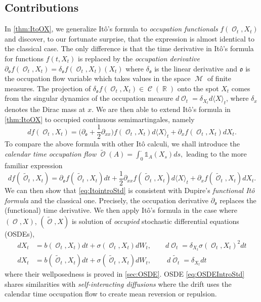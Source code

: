 \documentclass[11pt]{article}
\def\mo{\mathfrak{o}}
\theoremstyle{plain}
\theoremstyle{definition}
\DeclareMathOperator{\R}{\mathbb{R}}
\DeclareMathOperator{\calC}{\mathcal{C}}
\DeclareMathOperator{\calM}{\mathcal{M}}
\DeclareMathOperator{\calO}{\mathcal{O}}
\begin{document}
\subsection{Contributions}
In \cref{thm:ItoOX},  we generalize Itô's formula to \textit{occupation functionals} $ f(\calO_t,X_t)$  and discover, to our fortunate  
surprise, that the expression is almost identical to  the classical case. The only difference is that the time derivative  in Itô's formula for functions $ f(t,X_t)$ 
is replaced by the \textit{occupation derivative} $\partial_{\mo}f(\calO_t,X_t) = \delta_{\mo}f(\calO_t,X_t)(X_t)$ where $\delta_{\mo}$ 
is the linear derivative \cite[Chapter 2]{CardDelLasLio} and  $\mo$ is the occupation flow variable which takes values in the space $\calM$ of finite measures. The projection of  $\delta_{\mo}f(\calO_t,X_t) \in \calC(\R)$ onto the spot  $X_t$ comes from  the singular dynamics of  the occupation measure   
$d\calO_t = \delta_{X_t} d\langle X \rangle_t$, where $\delta_x$ denotes the Dirac mass at $x$.  
 We are  then able to extend Itô's formula in \cref{thm:ItoOX} to occupied continuous semimartingales, namely
\begin{equation}\label{eq:Itointro}
    df(\calO_t,X_t) = \Big(\partial_{\mo} + \frac{1}{2} \partial_{xx}\Big)f(\calO_t,X_t) d\langle X \rangle_t + \partial_x f(\calO_t,X_t)dX_t.
\end{equation}
 To compare the above formula with other It\^o calculi, we shall introduce the \textit{calendar time occupation flow} 
$\tilde{\calO}(A) = \int_0^{\cdot} \mathds{1}_{A}(X_s)ds,$ leading to the more familiar expression
\begin{equation}\label{eq:ItointroStd}
    df(\tilde{\calO}_t,X_t) = \partial_{\mo}f(\tilde{\calO}_t,X_t) dt +  \frac{1}{2} \partial_{xx}f(\tilde{\calO}_t,X_t) d\langle X \rangle_t + \partial_x f(\tilde{\calO}_t,X_t)dX_t.
\end{equation} 
We can then show that  \eqref{eq:ItointroStd} is consistent with  Dupire's \textit{functional Itô formula} \cite{DupireFITO} and the classical one. Precisely, the occupation derivative $\partial_{\mo}$ replaces   the (functional) time derivative. We then apply It\^o's formula in the case where $(\calO,X)$, $(\tilde{\calO},X)$ is solution of  \textit{occupied} stochastic differential equations (OSDEs),
\begin{align}
     dX_t  &=   b(\calO_t,X_t)dt + \sigma(\calO_t,X_t)dW_t, \qquad d\calO_t =  \delta_{X_t} \sigma(\calO_t,X_t)^2dt\label{eq:OSDEIntro} \\[0.5em] 
  dX_t  &=   b(\tilde{\calO}_t,X_t)dt + \sigma(\tilde{\calO}_t,X_t)dW_t, \qquad \ d\tilde{\calO}_t =  \delta_{X_t} dt\label{eq:OSDEIntroStd} 
\end{align}
where their wellposedness is proved in \cref{sec:OSDE}. OSDE \eqref{eq:OSDEIntroStd} shares similarities with \textit{self-interacting diffusions} \cite{DurrettRogers, CranstonLeJan, Raimond, Benaim1,Benaim2,Benaim3,Benaim4}  where the drift uses the  calendar time occupation flow to create mean reversion or repulsion. 
\end{document}
